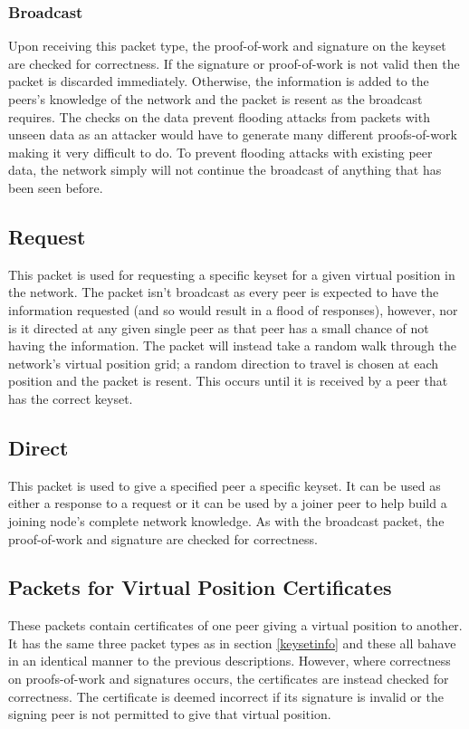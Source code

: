 \documentclass[ %
                    author={Luke Murray},
                supervisor={Dr. Simon Hollis},
                     title={Shadow Peer-to-Peer Networks},
                  subtitle={},
                    degree={MEng},
                      year={2013} ]{thesis}
\begin{document}
\subsubsection{Broadcast}

Upon receiving this packet type, the proof-of-work and signature on the keyset are checked for correctness. If the signature or proof-of-work is not valid then the packet is discarded immediately. Otherwise, the information is added to the peers's knowledge of the network and the packet is resent as the broadcast requires. The checks on the data prevent flooding attacks from packets with unseen data as an attacker would have to generate many different proofs-of-work making it very difficult to do. To prevent flooding attacks with existing peer data, the network simply will not continue the broadcast of anything that has been seen before.

\subsection{Request}

This packet is used for requesting a specific keyset for a given virtual position in the network. The packet isn't broadcast as every peer is expected to have the information requested (and so would result in a flood of responses), however, nor is it directed at any given single peer as that peer has a small chance of not having the information. The packet will instead take a random walk through the network's virtual position grid; a random direction to travel is chosen at each position and the packet is resent. This occurs until it is received by a peer that has the correct keyset.

\subsection{Direct}

This packet is used to give a specified peer a specific keyset. It can be used as either a response to a request or it can be used by a joiner peer to help build a joining node's complete network knowledge. As with the broadcast packet, the proof-of-work and signature are checked for correctness.

\subsection{Packets for Virtual Position Certificates}

These packets contain certificates of one peer giving a virtual position to another. It has the same three packet types as in section \ref{keysetinfo} and these all bahave in an identical manner to the previous descriptions. However, where correctness on proofs-of-work and signatures occurs, the certificates are instead checked for correctness. The certificate is deemed incorrect if its signature is invalid or the signing peer is not permitted to give that virtual position.
\end{document}
